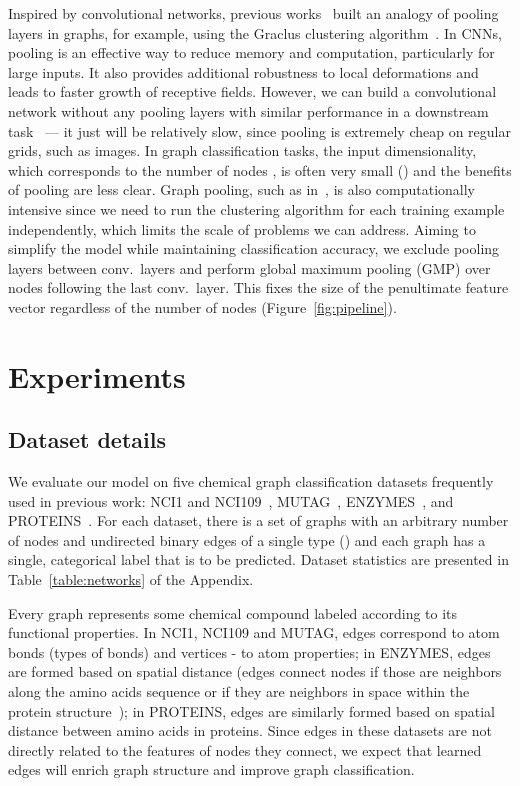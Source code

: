 \documentclass[final,nonatbib]{article} \usepackage{nips_2018}
\begin{document}
	Inspired by convolutional networks, previous works~\cite{bruna2013spectral, defferrard2016convolutional,monti2017geometric,simonovsky2017dynamic,fey2018splinecnn} built an analogy of pooling layers in graphs, for example, using the Graclus clustering algorithm~\cite{dhillon2007weighted}.
	In CNNs, pooling is an effective way to reduce memory and computation, particularly for large inputs. It also provides additional robustness to local deformations and leads to faster growth of receptive fields. However, we can build a convolutional network without any pooling layers with similar performance in a downstream task~\cite{springenberg2014striving} --- it just will be relatively slow, since pooling is extremely cheap on regular grids, such as images.
	In graph classification tasks, the input dimensionality, which corresponds to the number of nodes , is often very small () and the benefits of pooling are less clear. Graph pooling, such as in~\cite{dhillon2007weighted}, is also computationally intensive since we need to run the clustering algorithm for each training example independently, which limits the scale of problems we can address.
	Aiming to simplify the model while maintaining classification accuracy, we exclude pooling layers between conv.~layers and perform global maximum pooling (GMP) over nodes following the last conv.~layer. This fixes the size of the penultimate feature vector regardless of the number of nodes (Figure~\ref{fig:pipeline}).


	\section{Experiments}\label{sec:experiments}



	\subsection{Dataset details}
	We evaluate our model on five chemical graph classification datasets frequently used in previous work: NCI1 and NCI109~\cite{wale2008comparison}, MUTAG~\cite{debnath1991structure}, ENZYMES~\cite{schomburg2004brenda}, and PROTEINS~\cite{borgwardt2005protein}. For each dataset, there is a set of graphs with an arbitrary number of nodes  and undirected binary edges  of a single type () and each graph  has a single, categorical label that is to be predicted. Dataset statistics are presented in Table~\ref{table:networks} of the Appendix.

	Every graph represents some chemical compound labeled according to its functional properties.
	In NCI1, NCI109 and MUTAG, edges correspond to atom bonds (types of bonds) and vertices - to atom properties;	in ENZYMES, edges are formed based on spatial distance (edges connect nodes if those are neighbors along the amino acids sequence or if they are neighbors in space within the protein structure~\cite{borgwardt2005protein}); in PROTEINS, edges are similarly formed based on spatial distance between amino acids in proteins. Since edges in these datasets are not directly related to the features of nodes they connect, we expect that learned edges will enrich graph structure and improve graph classification.
\end{document}
